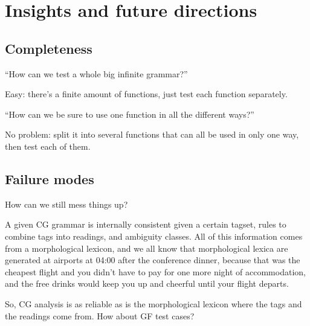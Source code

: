 

\section{Insights and future directions}

\subsection{Completeness}


“How can we test a whole big infinite grammar?”

Easy: there’s a finite amount of functions, just test each function separately.

“How can we be sure to use one function in all the different ways?”

No problem: split it into several functions that can all be used in
only one way, then test each of them.

\subsection{Failure modes}

How can we still mess things up?

A given CG grammar is internally consistent given a certain tagset, rules to combine tags into readings, and ambiguity classes. All of this information comes from a morphological lexicon, and we all know that morphological lexica are generated at airports at 04:00 after the conference dinner, because that was the cheapest flight and you didn’t have to pay for one more night of accommodation, and the free drinks would keep you up and cheerful until your flight departs.

So, CG analysis is as reliable as is the morphological lexicon where the tags and the readings come from. How about GF test cases?


